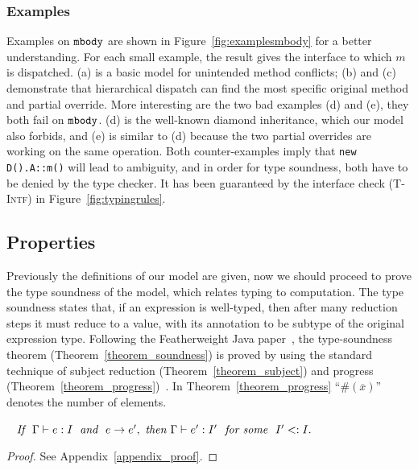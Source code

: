 \subsubsection{Examples}

Examples on $\texttt{mbody}$ are shown in Figure~\ref{fig:examplesmbody} for a better understanding. For each small example, the result
gives the interface to which $m$ is dispatched. (a) is a basic model for unintended method conflicts; (b) and (c) demonstrate
that hierarchical dispatch can find the most specific original method and partial override. More interesting are the two bad examples
(d) and (e), they both fail on $\texttt{mbody}$. (d) is the well-known diamond inheritance, which our model also forbids, and (e) is similar to
(d) because the two partial overrides are working on the same operation. Both counter-examples imply that \lstinline|new D().A::m()| will
lead to ambiguity, and in order for type soundness, both have to be denied by the type checker. It has been guaranteed by the interface check
\textsc{(T-Intf)} in Figure~\ref{fig:typingrules}.

\subsection{Properties}
Previously the definitions of our model are given, now we should proceed to prove the type soundness of 
the model, which relates typing to computation. The type soundness states that, if an expression is 
well-typed, then after many reduction steps it must reduce to a value, with its annotation to be subtype of the original expression type.
Following the Featherweight Java paper~\cite{Igarashi01FJ}, the type-soundness theorem 
(Theorem~\ref{theorem_soundness}) is proved by using the standard technique of subject reduction (Theorem~\ref{theorem_subject})
and progress (Theorem~\ref{theorem_progress})~\cite{Wright1994}. In Theorem~\ref{theorem_progress} ``$\#(\overline{x})$'' denotes the number of
elements.

\begin{theorem}~\label{theorem_subject}
$\textit{If } \ \judgeewf \Gamma {e : I} \; \textit{ and } \ e \rightarrow e',\ 
\textit{then } \judgeewf \Gamma {e' : I'} \ \textit{ for some } \ I' <: I.$
\end{theorem}
\begin{proof}
See Appendix~\ref{appendix_proof}.
\end{proof}

